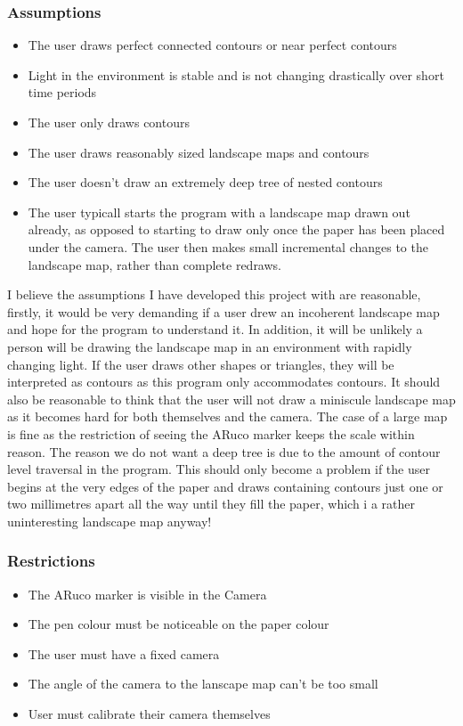 \documentclass[11pt]{article}
\begin{document}
\subsubsection{Assumptions}
\begin{itemize}
    \item The user draws perfect connected contours or near 
    	  perfect contours
    \item Light in the environment is stable and is not
    	  changing drastically over short time periods
    \item The user only draws contours
    \item The user draws reasonably sized landscape maps and contours
    \item The user doesn't draw an extremely deep tree of nested contours
    \item The user typicall starts the program with a landscape map drawn
    	  out already, as opposed to starting to draw only once the paper
    	  has been placed under the camera. The user then makes small 
    	  incremental changes to the landscape map, rather than complete 
    	  redraws.
\end{itemize}

I believe the assumptions I have developed this project with are reasonable,
firstly, it would be very demanding if a user drew an incoherent landscape
map and hope for the program to understand it. In addition, it will be
unlikely a person will be drawing the landscape map in an environment
with rapidly changing light. If the user draws other shapes or triangles,
they will be interpreted as contours as this program only accommodates contours.
It should also be reasonable to think that the user will not draw a 
miniscule landscape map as it becomes hard for both themselves and the camera.
The case of a large map is fine as the restriction of seeing the ARuco 
marker keeps the scale within reason. The reason we do not want a deep
tree is due to the amount of contour level traversal in the program. This
should only become a problem if the user begins at the very edges of the paper
and draws containing contours just one or two millimetres apart all the
way until they fill the paper, which i a rather uninteresting landscape map
anyway!

\subsubsection{Restrictions}
\begin{itemize}
    \item The ARuco marker is visible in the Camera
    \item The pen colour must be noticeable on the paper colour
    \item The user must have a fixed camera
    \item The angle of the camera to the lanscape map can't be too small
   	\item User must calibrate their camera themselves          
\end{itemize}
\end{document}
